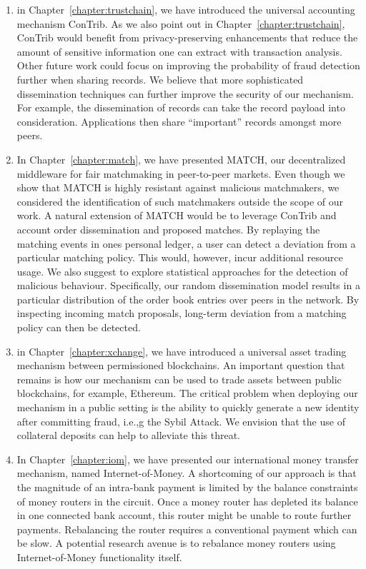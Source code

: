 \begin{enumerate}
	\item in Chapter~\ref{chapter:trustchain}, we have introduced the universal accounting mechanism ConTrib.
	As we also point out in Chapter~\ref{chapter:trustchain}, ConTrib would benefit from privacy-preserving enhancements that reduce the amount of sensitive information one can extract with transaction analysis.
	Other future work could focus on improving the probability of fraud detection further when sharing records.
	We believe that more sophisticated dissemination techniques can further improve the security of our mechanism.
	For example, the dissemination of records can take the record payload into consideration.
	Applications then share \enquote{important} records amongst more peers.
	
	\item In Chapter~\ref{chapter:match}, we have presented MATCH, our decentralized middleware for fair matchmaking in peer-to-peer markets.
	Even though we show that MATCH is highly resistant against malicious matchmakers, we considered the identification of such matchmakers outside the scope of our work.
	A natural extension of MATCH would be to leverage ConTrib and account order dissemination and proposed matches.
	By replaying the matching events in ones personal ledger, a user can detect a deviation from a particular matching policy.
	This would, however, incur additional resource usage.
	We also suggest to explore statistical approaches for the detection of malicious behaviour.
	Specifically, our random dissemination model results in a particular distribution of the order book entries over peers in the network.
	By inspecting incoming match proposals, long-term deviation from a matching policy can then be detected.
	
	\item in Chapter~\ref{chapter:xchange}, we have introduced a universal asset trading mechanism between permissioned blockchains.
	An important question that remains is how our mechanism can be used to trade assets between public blockchains, for example, Ethereum.
	The critical problem when deploying our mechanism in a public setting is the ability to quickly generate a new identity after committing fraud, i.e.,g the Sybil Attack.
	We envision that the use of collateral deposits can help to alleviate this threat.
	
	\item In Chapter~\ref{chapter:iom}, we have presented our international money transfer mechanism, named Internet-of-Money.
	A shortcoming of our approach is that the magnitude of an intra-bank payment is limited by the balance constraints of money routers in the circuit.
	Once a money router has depleted its balance in one connected bank account, this router might be unable to route further payments.
	Rebalancing the router requires a conventional payment which can be slow.
	A potential research avenue is to rebalance money routers using Internet-of-Money functionality itself.
	

\end{enumerate}
